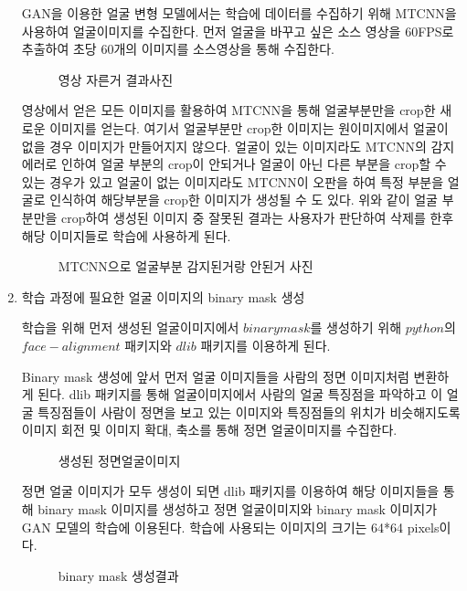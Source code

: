 \documentclass[chapter,oneside]{oblivoir}
\begin{document}
\begin{enumerate}
    GAN을 이용한 얼굴 변형 모델에서는 학습에 데이터를 수집하기 위해 MTCNN을 사용하여 얼굴이미지를 수집한다. 먼저 얼굴을 바꾸고 싶은 소스 영상을 60FPS로 추출하여 초당 60개의 이미지를 소스영상을 통해 수집한다.

    \begin{figure}[h!]%
    \centering
    \caption{영상 자른거 결과사진}
    \end{figure}


    영상에서 얻은 모든 이미지를 활용하여 MTCNN을 통해 얼굴부분만을 crop한 새로운 이미지를 얻는다. 여기서 얼굴부분만 crop한 이미지는 원이미지에서 얼굴이 없을 경우 이미지가 만들어지지 않으다. 얼굴이 있는 이미지라도 MTCNN의 감지 에러로 인하여 얼굴 부분의 crop이 안되거나 얼굴이 아닌 다른 부분을 crop할 수 있는 경우가 있고 얼굴이 없는 이미지라도 MTCNN이 오판을 하여 특정 부분을 얼굴로 인식하여 해당부분을 crop한 이미지가 생성될 수 도 있다. 위와 같이 얼굴 부분만을 crop하여 생성된 이미지 중 잘못된 결과는 사용자가 판단하여 삭제를 한후 해당 이미지들로 학습에 사용하게 된다.

    \begin{figure}[h!]%
    \centering
    \caption{MTCNN으로 얼굴부분 감지된거랑 안된거 사진}
    \end{figure}


    \item 학습 과정에 필요한 얼굴 이미지의 binary mask 생성

    학습을 위해 먼저 생성된 얼굴이미지에서 $binary mask$를 생성하기 위해 $python$의 $face-alignment$ 패키지와 $dlib$ 패키지를 이용하게 된다.

    Binary mask 생성에 앞서 먼저 얼굴 이미지들을 사람의 정면 이미지처럼 변환하게 된다. dlib 패키지를 통해 얼굴이미지에서 사람의 얼굴 특징점을 파악하고 이 얼굴 특징점들이 사람이 정면을 보고 있는 이미지와 특징점들의 위치가 비슷해지도록 이미지 회전 및 이미지 확대, 축소를 통해 정면 얼굴이미지를 수집한다.
    \begin{figure}[h!] %
    \centering
    \caption{생성된 정면얼굴이미지}
    \end{figure}



    정면 얼굴 이미지가 모두 생성이 되면 dlib 패키지를 이용하여 해당 이미지들을 통해 binary mask 이미지를 생성하고 정면 얼굴이미지와 binary mask 이미지가 GAN 모델의 학습에 이용된다. 학습에 사용되는 이미지의 크기는 64*64 pixels이다. 
    \begin{figure}[h!]%
    \centering
    \caption{binary mask 생성결과}
    \end{figure}



\end{enumerate}
\end{document}
